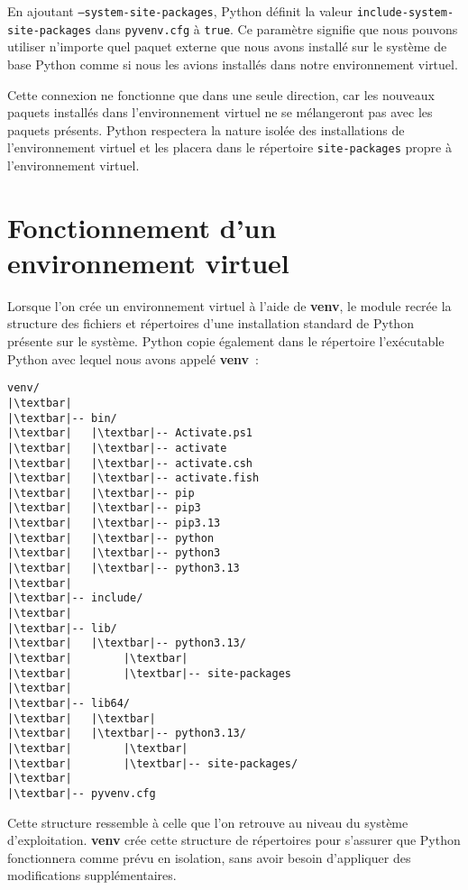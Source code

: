 En ajoutant \texttt{--system-site-packages}, Python définit la valeur \texttt{include-system-}\\
\texttt{site-packages} dans \texttt{pyvenv.cfg} à \texttt{true}. Ce paramètre signifie que nous pouvons utiliser n’importe quel paquet externe que nous avons installé sur le système de base Python comme si nous les avions installés dans notre environnement virtuel.

Cette connexion ne fonctionne que dans une seule direction, car les nouveaux paquets installés dans l'environnement virtuel ne se mélangeront pas avec les paquets présents. Python respectera la nature isolée des installations de l'environnement virtuel et les placera dans le répertoire \texttt{site-packages} propre à l’environnement virtuel.

\section{Fonctionnement d'un environnement virtuel}

Lorsque l'on crée un environnement virtuel à l’aide de \textbf{venv}, le module recrée la structure des fichiers et répertoires d’une installation standard de Python présente sur le système. Python copie également dans le répertoire l’exécutable Python avec lequel nous avons appelé \textbf{venv} :
\begin{lstlisting}[style=tree]
venv/
|\textbar|
|\textbar|-- bin/
|\textbar|   |\textbar|-- Activate.ps1
|\textbar|   |\textbar|-- activate
|\textbar|   |\textbar|-- activate.csh
|\textbar|   |\textbar|-- activate.fish
|\textbar|   |\textbar|-- pip
|\textbar|   |\textbar|-- pip3
|\textbar|   |\textbar|-- pip3.13
|\textbar|   |\textbar|-- python
|\textbar|   |\textbar|-- python3
|\textbar|   |\textbar|-- python3.13
|\textbar|
|\textbar|-- include/
|\textbar|
|\textbar|-- lib/
|\textbar|   |\textbar|-- python3.13/
|\textbar|        |\textbar|
|\textbar|        |\textbar|-- site-packages
|\textbar|
|\textbar|-- lib64/
|\textbar|   |\textbar|
|\textbar|   |\textbar|-- python3.13/
|\textbar|        |\textbar|
|\textbar|        |\textbar|-- site-packages/
|\textbar|
|\textbar|-- pyvenv.cfg
\end{lstlisting}

Cette structure ressemble à celle que l'on retrouve au niveau du système d'exploitation. \textbf{venv} crée cette structure de répertoires pour s’assurer que Python fonctionnera comme prévu en isolation, sans avoir besoin d’appliquer des modifications supplémentaires. 

